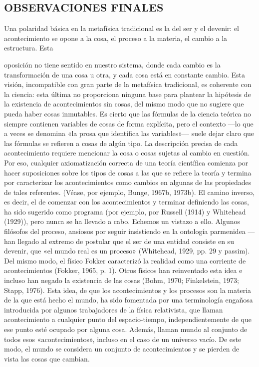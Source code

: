 \begin{justifying}
  \section{\centering OBSERVACIONES FINALES}
    \bigskip
    Una polaridad básica en la metafísica tradicional es la del ser y el devenir:
  el acontecimiento se opone a la cosa, el proceso a la materia, el cambio a la estructura. Esta

  oposición no tiene sentido en nuestro sistema, donde cada cambio es la
  transformación de una cosa u otra, y cada cosa está en constante cambio. Esta
  visión, incompatible con gran parte de la metafísica tradicional, es coherente
  con la ciencia: esta última no proporciona ninguna base para plantear la hipótesis de la
  existencia de acontecimientos sin cosas, del mismo modo que no sugiere que pueda
  haber cosas inmutables. Es cierto que las fórmulas de la ciencia teórica no
  siempre contienen variables de cosas de forma explícita, pero el contexto —lo que
  a veces se denomina «la prosa que identifica las variables»— suele
  dejar claro que las fórmulas se refieren a cosas de algún tipo.
  La descripción precisa de cada acontecimiento requiere mencionar la cosa o
  cosas sujetas al cambio en cuestión. Por eso, cualquier axiomatización correcta
  de una teoría científica comienza por hacer suposiciones
  sobre los tipos de cosas a las que se refiere la teoría y termina por
  caracterizar los acontecimientos como cambios en algunas de las propiedades de tales
  referentes. (Véase, por ejemplo, Bunge, 1967b, 1973b). El camino inverso, es decir,
  el de comenzar con los acontecimientos y terminar definiendo las cosas, ha sido
  sugerido como programa (por ejemplo, por Russell (1914) y Whitehead (1929)),
  pero nunca se ha llevado a cabo. Echemos un vistazo a ello.
  Algunos filósofos del proceso, ansiosos por seguir insistiendo en la
  ontología parmenidea —han llegado al extremo de postular que el
  ser de una entidad consiste en su devenir, que «el mundo real es un
  proceso» (Whitehead, 1929, pp. 29 y passim). Del mismo modo, el físico
  Fokker caracterizó la realidad como una corriente de acontecimientos (Fokker, 1965, p. 1).
  Otros físicos han reinventado esta idea e incluso han negado la
  existencia de las cosas (Bohm, 1970; Finkelstein, 1973; Stapp, 1976). Esta
  idea, de que los acontecimientos y los procesos son la materia de la que está hecho el mundo, ha
  sido fomentada por una terminología engañosa introducida por algunos
  trabajadores de la física relativista, que llaman acontecimiento a cualquier punto del espacio-tiempo,
  independientemente de que ese punto esté ocupado por alguna cosa. Además,
  llaman mundo al conjunto de todos esos «acontecimientos», incluso en el caso de un universo vacío.
  De este modo, el mundo se considera un conjunto de acontecimientos y se pierden de vista las cosas que
  cambian.


\end{justifying}
